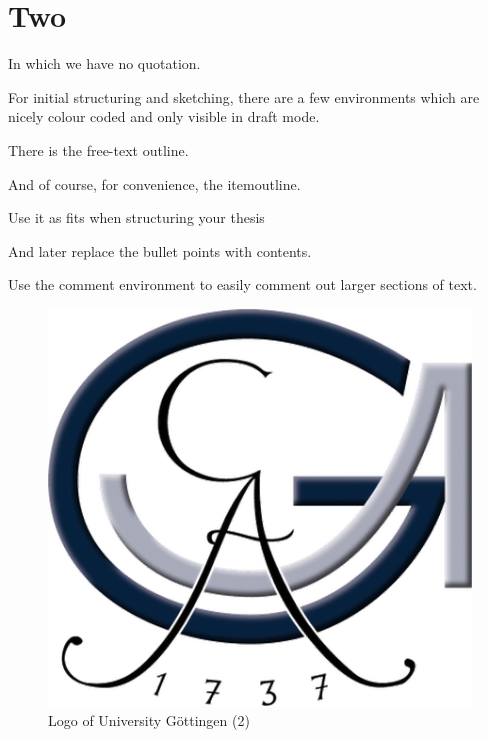 
\chapter{Two}
\label{cha:two}

In which we have no quotation.

For initial structuring and sketching, there are a few environments which are nicely colour coded and only visible in draft mode.

\begin{outline}
  There is the free-text outline.
\end{outline}

\begin{itemoutline}
\item And of course, for convenience, the itemoutline.
\item Use it as fits when structuring your thesis
\item And later replace the bullet points with contents.
\end{itemoutline}

Use the comment environment to easily comment out larger sections of text.

\begin{figure}[!ht]
  \centering
  \includegraphics{figures/UniLogo1.png}
  \caption{Logo of University Göttingen (2)}
  \label{fig:logo-2}
\end{figure}

